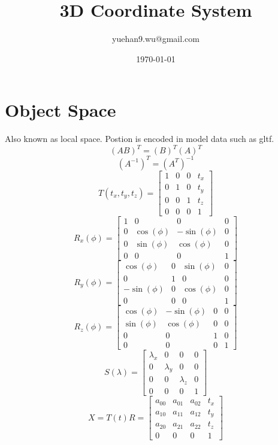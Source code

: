 \documentclass{article}
\title{3D Coordinate System}
\author{yuehan9.wu@gmail.com}
\date{\today}
\begin{document}
\maketitle
\section*{Object Space}
Also known as local space. Postion is encoded in model data such as gltf.
\[(AB)^{T} = (B)^{T}(A)^{T}\]
\[(A^{-1})^{T} = (A^{T})^{-1}\]
\[T(t_{x}, t_{y}, t_{z}) = \begin{bmatrix}
    1 &0 &0 &t_{x} \\
    0 &1 &0 &t_{y} \\
    0 &0 &1 &t_{z} \\
    0 &0 &0 &1
\end{bmatrix}\]
\[R_{x}(\phi) = \begin{bmatrix}
    1 &0 &0 &0 \\
    0 &\cos(\phi) &-\sin(\phi) &0 \\
    0 &\sin(\phi) &\cos(\phi) &0 \\
    0 &0 &0 &1
\end{bmatrix}\]
\[R_{y}(\phi) = \begin{bmatrix}
    \cos(\phi) &0 &\sin(\phi) &0 \\
    0 &1 &0 &0 \\
    -\sin(\phi) &0 &\cos(\phi) &0 \\
    0 &0 &0 &1
\end{bmatrix}\]
\[R_{z}(\phi) = \begin{bmatrix}
    \cos(\phi) &-\sin(\phi) &0 &0 \\
    \sin(\phi) &\cos(\phi) &0 &0 \\
    0 &0 &1 &0 \\
    0 &0 &0 &1
\end{bmatrix}\]
\[S(\lambda ) = \begin{bmatrix}
    \lambda_{x} &0 &0 &0 \\
    0 &\lambda_{y} &0 &0 \\
    0 &0 &\lambda_{z} &0 \\
    0 &0 &0 &1
\end{bmatrix}\]
\[X = T(t)R = \begin{bmatrix}
    a_{00} &a_{01} &a_{02} &t_{x} \\
    a_{10} &a_{11} &a_{12} &t_{y} \\
    a_{20} &a_{21} &a_{22} &t_{z} \\
    0 &0 &0 &1
\end{bmatrix}\]
\end{document}
